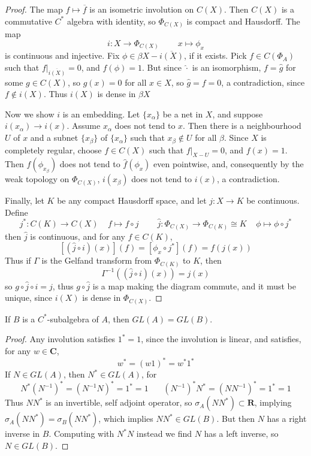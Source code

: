 \begin{proof}
    The map $f \mapsto \overline{f}$ is an isometric involution on $C(X)$. Then $C(X)$ is a commutative $C^*$ algebra with identity, so $\Phi_{C(X)}$ is compact and Hausdorff. The map
    \[ i: X \to \Phi_{C(X)}\ \ \ \ \ \ \ \ \ \ x \mapsto \phi_x \]
    is continuous and injective. Fix $\phi \in \beta X - \overline{i(X)}$, if it exists. Pick $f \in C(\Phi_A)$ such that $f|_{\overline{i(X)}} = 0$, and $f(\phi) = 1$. But since $\widehat{\cdot}$ is an isomorphism, $f = \widehat{g}$ for some $g \in C(X)$, so $g(x) = 0$ for all $x \in X$, so $\widehat{g} = f = 0$, a contradiction, since $f \not \in i(X)$. Thus $i(X)$ is dense in $\beta X$

    Now we show $i$ is an embedding. Let $\{ x_\alpha \}$ be a net in $X$, and suppose $i(x_\alpha) \to i(x)$. Assume $x_\alpha$ does not tend to $x$. Then there is a neighbourhood $U$ of $x$ and a subnet $\{ x_\beta \}$ of $\{ x_\alpha \}$ such that $x_\beta \not \in U$ for all $\beta$. Since $X$ is completely regular, choose $f \in C(X)$ such that $f|_{X - U} = 0$, and $f(x) = 1$. Then $\widehat{f}(\phi_{x_\beta})$ does not tend to $\widehat{f}(\phi_x)$ even pointwise, and, consequently by the weak topology on $\Phi_{C(X)}$, $i(x_\beta)$ does not tend to $i(x)$, a contradiction.

    Finally, let $K$ be any compact Hausdorff space, and let $j: X \to K$ be continuous. Define
    \[ j^*: C(K) \to C(X)\ \ \ \ \ f \mapsto f \circ j\ \ \ \ \ \ \ \ \ \ \widehat{j}: \Phi_{C(X)} \to \Phi_{C(K)} \cong K\ \ \ \ \ \phi \mapsto \phi \circ j^* \]
    then $\widehat{j}$ is continuous, and for any $f \in C(K)$,
    \[ [(\widehat{j} \circ i)(x)](f) = [\phi_x \circ j^*](f) = f(j(x)) \]
    Thus if $\Gamma$ is the Gelfand transform from $\Phi_{C(K)}$ to $K$, then
    \[ \Gamma^{-1}((\widehat{j} \circ i)(x)) = j(x) \]
    so $g \circ \widehat{j} \circ i = j$, thus $g \circ \widehat{j}$ is a map making the diagram commute, and it must be unique, since $i(X)$ is dense in $\Phi_{C(X)}$.
\end{proof}

\begin{theorem}
    If  $B$ is a $C^*$-subalgebra of $A$, then $GL(A) = GL(B)$.
\end{theorem}
\begin{proof}
    Any involution satisfies $1^* = 1$, since the involution is linear, and satisfies, for any $w \in \mathbf{C}$,
    \[ w^* = (w1)^* = w^*1^* \]
    If $N \in GL(A)$, then $N^* \in GL(A)$, for
    \[ N^*(N^{-1})^* = (N^{-1}N)^* = 1^* = 1\ \ \ \ \ \ \ \ (N^{-1})^* N^* = (NN^{-1})^* = 1^* = 1 \]
    Thus $NN^*$ is an invertible, self adjoint operator, so $\sigma_A(NN^*) \subset \mathbf{R}$, implying $\sigma_A(NN^*) = \sigma_B(NN^*)$, which implies $NN^* \in GL(B)$. But then $N$ has a right inverse in $B$. Computing with $N^*N$ instead we find $N$ has a left inverse, so $N \in GL(B)$.
\end{proof}

